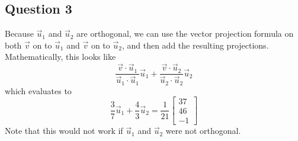 \documentclass[11pt]{article}
\begin{document}
\subsection*{Question 3}

Because $\vec{u}_1$ and $\vec{u}_2$ are orthogonal, we can use the vector projection formula on both $\vec{v}$ on to $\vec{u}_1$ and $\vec{v}$ on to $\vec{u}_2$, and then add the resulting projections. Mathematically, this looks like
\[
\frac{\vec{v}\cdot \vec{u}_1}{\vec{u}_1\cdot \vec{u}_1}\vec{u}_1 + \frac{\vec{v}\cdot \vec{u}_2}{\vec{u}_2\cdot \vec{u}_2}\vec{u}_2
\]
which evaluates to 
\[
\frac{3}{7}\vec{u}_1 + \frac{4}{3}\vec{u}_2=\frac{1}{21}\begin{bmatrix}
    37\\46\\-1
\end{bmatrix}
\]
Note that this would not work if $\vec{u}_1$ and $\vec{u}_2$ were not orthogonal.
\end{document}
